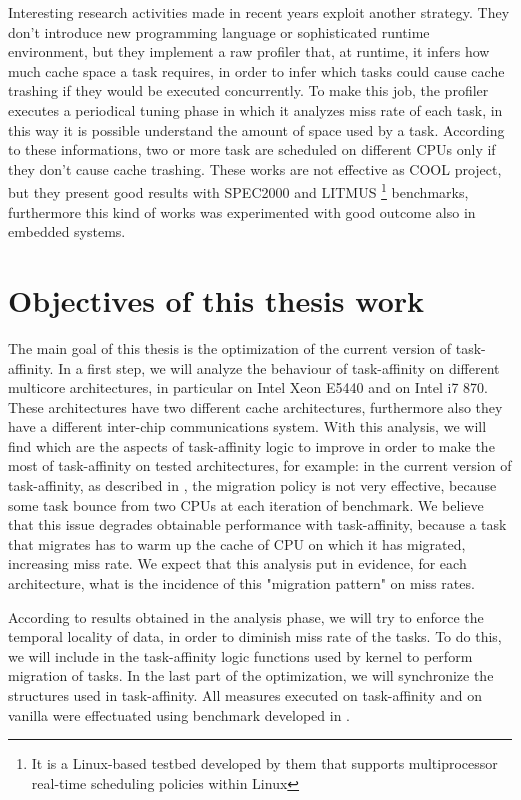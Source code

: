 Interesting research activities made in recent years exploit another strategy. They don't introduce new programming language or sophisticated runtime 
environment, but they implement a raw profiler that, at runtime, it infers how much cache space a task requires, in order to infer which 
tasks could cause cache trashing if they would be executed concurrently.
To make this job, the profiler executes a periodical tuning phase in which it analyzes miss rate of each task, in this way it is possible understand the 
amount of space used by a task. According to these informations, two or more
task are scheduled on different CPUs only if 
they don't cause cache trashing. These works are not effective as COOL project, but they present good results with SPEC2000 and 
LITMUS \footnote{It is a Linux-based testbed developed by them that supports multiprocessor real-time scheduling policies within Linux} benchmarks, 
furthermore this kind of works was experimented with good outcome also in embedded systems.

\section{Objectives of this thesis work}
\label{sec:ObjectiveOfThesis}

The main goal of this thesis is the optimization of the current version of task-affinity. In a first step, we will analyze the behaviour of task-affinity
on different multicore architectures, in particular on Intel Xeon E5440 and on Intel i7 870. These architectures have two different cache architectures, 
furthermore also they have a different inter-chip communications system. With this analysis, we will find which are the aspects of task-affinity logic to 
improve in order to make the most of task-affinity on tested architectures, for example: in the current version of task-affinity, 
as described in \cite{lcs}, the migration policy is not very effective, because some task bounce from two CPUs at each iteration of benchmark. We believe
that this issue degrades obtainable performance with task-affinity, because a task that migrates has to warm up the cache of CPU on which it has migrated, 
increasing miss rate. We expect that this analysis put in evidence, for each architecture, what is the incidence of this "migration pattern" on miss rates.

According to results obtained in the analysis phase, we will try to enforce the temporal locality of data, in order to diminish miss rate of the tasks. To 
do this, we will include in the task-affinity logic functions used by kernel to perform migration of tasks. In the last part of the optimization, we will 
synchronize the structures used in task-affinity. All measures executed on task-affinity and on vanilla were effectuated using benchmark developed in 
\cite{lcs}.

